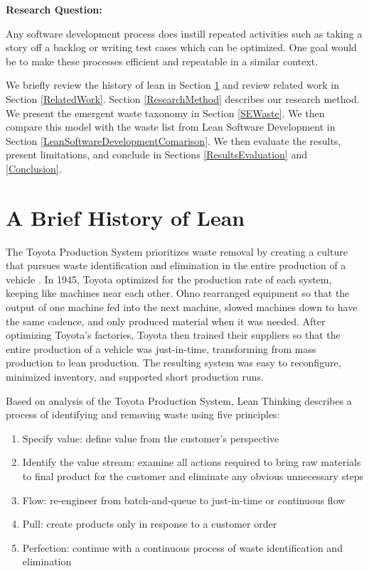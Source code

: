 \textbf{Research Question: }

Any software development process does instill repeated activities such as taking a story off a backlog or writing test cases which can be optimized. One goal would be to make these processes efficient and repeatable in a similar context. 

We briefly review the history of lean in Section \ref{HistoryOfLean} and review related work in Section \ref{RelatedWork}. Section \ref{ResearchMethod} describes our research method. We present the emergent waste taxonomy in Section \ref{SEWaste}. We then compare this model with the waste list from Lean Software Development in Section \ref{LeanSoftwareDevelopmentComarison}. We then evaluate the results, present limitations, and conclude in Sections \ref{ResultsEvaluation} and \ref{Conclusion}.

\section{A Brief History of Lean}
\label{HistoryOfLean}

The Toyota Production System prioritizes waste removal by creating a culture that pursues waste identification and elimination in the entire production of a vehicle \cite{OhnoToyotaProductionSystem, ShingoToyotaProductionSystem}. In 1945, Toyota optimized for the production rate of each system, keeping like machines near each other. Ohno rearranged equipment so that the output of one machine fed into the next machine, slowed machines down to have the same cadence, and only produced material when it was needed. After optimizing Toyota's factories, Toyota then trained their suppliers so that the entire production of a vehicle was just-in-time, transforming from mass production to lean production. The resulting  system was easy to reconfigure, minimized inventory, and supported short production runs.  

Based on analysis of the Toyota Production System, Lean Thinking \cite{WomackLeanThinking} describes a process of identifying and removing waste using five principles:
\begin{enumerate}
\item Specify value: define value from the customer's perspective
\item Identify the value stream: examine all actions required to bring raw materials to final product for the customer and eliminate any obvious unnecessary steps
\item Flow: re-engineer from batch-and-queue to just-in-time or continuous flow 
\item Pull: create products only in response to a customer order
\item Perfection: continue with a continuous process of waste identification and elimination
\end{enumerate}

